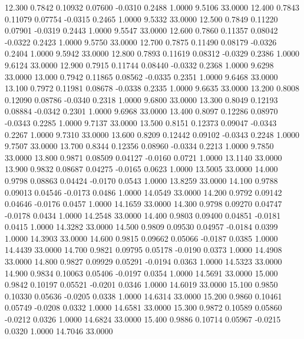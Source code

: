  12.300   0.7842   0.10932   0.07600  -0.0310   0.2488   1.0000   9.5106  33.0000
  12.400   0.7843   0.11079   0.07754  -0.0315   0.2465   1.0000   9.5332  33.0000
  12.500   0.7849   0.11220   0.07901  -0.0319   0.2443   1.0000   9.5547  33.0000
  12.600   0.7860   0.11357   0.08042  -0.0322   0.2423   1.0000   9.5750  33.0000
  12.700   0.7875   0.11490   0.08179  -0.0326   0.2404   1.0000   9.5942  33.0000
  12.800   0.7893   0.11619   0.08312  -0.0329   0.2386   1.0000   9.6124  33.0000
  12.900   0.7915   0.11744   0.08440  -0.0332   0.2368   1.0000   9.6298  33.0000
  13.000   0.7942   0.11865   0.08562  -0.0335   0.2351   1.0000   9.6468  33.0000
  13.100   0.7972   0.11981   0.08678  -0.0338   0.2335   1.0000   9.6635  33.0000
  13.200   0.8008   0.12090   0.08786  -0.0340   0.2318   1.0000   9.6800  33.0000
  13.300   0.8049   0.12193   0.08884  -0.0342   0.2301   1.0000   9.6968  33.0000
  13.400   0.8097   0.12286   0.08970  -0.0343   0.2285   1.0000   9.7137  33.0000
  13.500   0.8151   0.12373   0.09047  -0.0343   0.2267   1.0000   9.7310  33.0000
  13.600   0.8209   0.12442   0.09102  -0.0343   0.2248   1.0000   9.7507  33.0000
  13.700   0.8344   0.12356   0.08960  -0.0334   0.2213   1.0000   9.7850  33.0000
  13.800   0.9871   0.08509   0.04127  -0.0160   0.0721   1.0000  13.1140  33.0000
  13.900   0.9832   0.08687   0.04275  -0.0165   0.0623   1.0000  13.5005  33.0000
  14.000   0.9798   0.08863   0.04424  -0.0170   0.0543   1.0000  13.8259  33.0000
  14.100   0.9788   0.09013   0.04546  -0.0173   0.0486   1.0000  14.0549  33.0000
  14.200   0.9792   0.09142   0.04646  -0.0176   0.0457   1.0000  14.1659  33.0000
  14.300   0.9798   0.09270   0.04747  -0.0178   0.0434   1.0000  14.2548  33.0000
  14.400   0.9803   0.09400   0.04851  -0.0181   0.0415   1.0000  14.3282  33.0000
  14.500   0.9809   0.09530   0.04957  -0.0184   0.0399   1.0000  14.3903  33.0000
  14.600   0.9815   0.09662   0.05066  -0.0187   0.0385   1.0000  14.4439  33.0000
  14.700   0.9821   0.09795   0.05178  -0.0190   0.0373   1.0000  14.4908  33.0000
  14.800   0.9827   0.09929   0.05291  -0.0194   0.0363   1.0000  14.5323  33.0000
  14.900   0.9834   0.10063   0.05406  -0.0197   0.0354   1.0000  14.5691  33.0000
  15.000   0.9842   0.10197   0.05521  -0.0201   0.0346   1.0000  14.6019  33.0000
  15.100   0.9850   0.10330   0.05636  -0.0205   0.0338   1.0000  14.6314  33.0000
  15.200   0.9860   0.10461   0.05749  -0.0208   0.0332   1.0000  14.6581  33.0000
  15.300   0.9872   0.10589   0.05860  -0.0212   0.0326   1.0000  14.6824  33.0000
  15.400   0.9886   0.10714   0.05967  -0.0215   0.0320   1.0000  14.7046  33.0000
